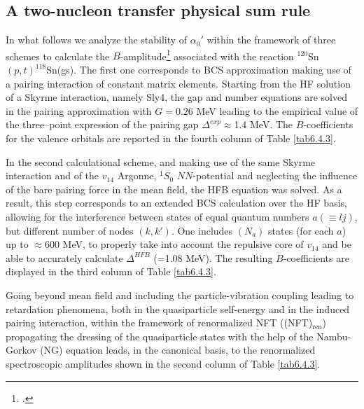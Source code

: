 \subsection{A two-nucleon transfer physical sum rule}\label{S6.4.2}
 In what follows we analyze the stability of $\alpha_0'$ within the framework of three schemes to calculate the $B$-amplitude\footnote{\cite{Potel:17}.} associated with the reaction $^{120}$Sn$(p,t)^{118}$Sn(gs). The first one corresponds to BCS approximation making use of a pairing interaction of constant matrix elements.  Starting from the HF solution of a Skyrme interaction, namely Sly4, the gap and number equations are solved in the pairing approximation with $G=0.26$ MeV leading to the empirical value of the three--point expression of the pairing gap $\Delta^{exp}\approx$1.4 MeV. The $B$-coefficients for the valence orbitals are reported in the fourth column of Table \ref{tab6.4.3}. 


In the second calculational scheme, and making use of the same Skyrme interaction and of the $v_{14}$ Argonne, $^1S_0$ $NN$-potential and neglecting the influence of the bare
pairing force in the mean field,
the HFB equation was solved. As a result, this step corresponds to an extended BCS calculation over the HF basis, allowing for the 
interference between states of equal quantum numbers $a (\equiv lj)$, but different number of nodes $(k,k')$. One includes $(N_a)$ states
(for each $a$) up to $\approx $600 MeV, to properly take into account  the repulsive core of $v_{14}$ and be able to accurately calculate 
$\Delta^{HFB}$ (=1.08 MeV). The resulting $B$-coefficients are displayed in the third column of Table \ref{tab6.4.3}.


 Going beyond mean field and including the particle-vibration coupling leading to retardation phenomena, both in the quasiparticle self-energy and in the  induced pairing interaction, within the framework of renormalized NFT ((NFT)$_{\text{ren}}$) propagating the dressing of the quasiparticle states with the help of the  Nambu-Gorkov (NG) equation leads, in the canonical basis, to the renormalized spectroscopic amplitudes shown in the second column of Table \ref{tab6.4.3}. 

